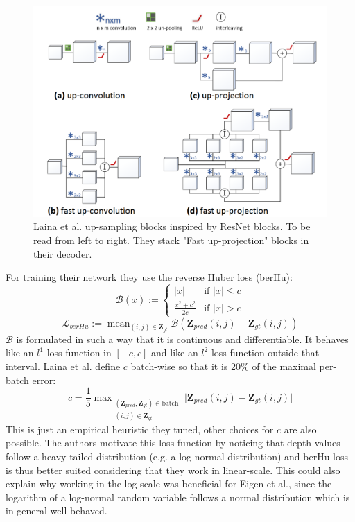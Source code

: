 \begin{figure}
\centering
\includegraphics[scale=0.4]{figs/Laina}
\caption{Laina et al. \cite{Laina} up-sampling blocks inspired by ResNet blocks. To be read from left to right. They stack "Fast up-projection" blocks in their decoder. \label{fig:Laina}}
\end{figure}

For training their network they use the reverse Huber loss (berHu):
\begin{equation}
	\mathcal{B}(x) := 
	\begin{cases}
		|x| & \text{if } |x| \leq c \\
		\frac{x^{2} + c^{2}}{2c} & \text{if } |x| > c
	\end{cases}
\end{equation}
\[
	\mathcal{L}_{berHu} := \mathop{\text{mean}}_{(i,j) \in \mathbf{Z}_{gt}} \mathcal{B}(\mathbf{Z}_{pred}(i,j) - \mathbf{Z}_{gt}(i,j))
\]
$\mathcal{B}$ is formulated in such a way that it is continuous and differentiable.
It behaves like an $l^{1}$ loss function in $[-c, c]$ and like an $l^{2}$ loss function outside that interval.
Laina et al. define $c$ batch-wise so that it is 20\% of the maximal per-batch error:
\[
	c = \frac{1}{5} \mathop{\text{max}}_{
		\substack{
			(\mathbf{Z}_{pred}, \mathbf{Z}_{gt}) \in \text{batch} \\
			(i,j) \in \mathbf{Z}_{gt}
		}
	} \big| \mathbf{Z}_{pred}(i,j) - \mathbf{Z}_{gt}(i,j) \big|
\]
This is just an empirical heuristic they tuned, other choices for $c$ are also possible.
The authors motivate this loss function by noticing that depth values follow a heavy-tailed distribution (e.g. a log-normal distribution) and berHu loss is thus better suited considering that they work in linear-scale.
This could also explain \cite{Laina} why working in the log-scale was beneficial for Eigen et al., since the logarithm of a log-normal random variable follows a normal distribution which is in general well-behaved.

